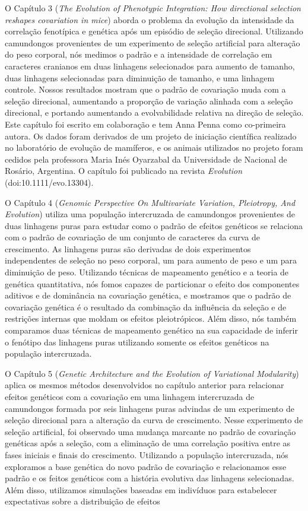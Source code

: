 \begin{refsection}
O Capítulo 3 (\textit{The Evolution of Phenotypic Integration: How directional
selection reshapes covariation in mice}) aborda o problema da evolução da
intensidade da correlação fenotípica e genética após um episódio de seleção
direcional. Utilizando camundongos provenientes de um experimento de seleção
artificial para alteração do peso corporal, nós medimos o padrão e a
intensidade de correlação em caracteres cranianos em duas linhagens
selecionados para aumento de tamanho, duas linhagens selecionadas para
diminuição de tamanho, e uma linhagem controle. Nossos resultados mostram que
o padrão de covariação muda com a seleção direcional, aumentando a proporção
de variação alinhada com a seleção direcional, e portando aumentando a
evolvabilidade relativa na direção de seleção. Este capítulo foi escrito em
colaboração e tem Anna Penna como co-primeira autora. Os dados foram derivados
de um projeto de iniciação científica realizado no laboratório de evolução de
mamíferos, e os animais utilizados no projeto foram cedidos pela professora
Maria Inés Oyarzabal da Universidade de Nacional de Rosário, Argentina. O
capítulo foi publicado na revista \textit{Evolution} (doi:10.1111/evo.13304).

O Capítulo 4 (\textit{Genomic Perspective On Multivariate Variation,
Pleiotropy, And Evolution}) utiliza uma população intercruzada de camundongos
provenientes de duas linhagens puras para estudar como o padrão de efeitos
genéticos se relaciona com o padrão de covariação de um conjunto de caracteres
da curva de crescimento. As linhagens puras são derivadas de dois experimentos
independentes de seleção no peso corporal, um para aumento de peso e um para
diminuição de peso. Utilizando técnicas de mapeamento genético e a teoria de
genética quantitativa, nós fomos capazes de particionar o efeito dos
componentes aditivos e de dominância na covariação genética, e mostramos que o
padrão de covariação genética é o resultado da combinação da influência da
seleção e de restrições internas que moldam os efeitos pleiotrópicos. Além
disso, nós também comparamos duas técnicas de mapeamento genético na sua
capacidade de inferir o fenótipo das linhagens puras utilizando somente os
efeitos genéticos na população intercruzada. 

O Capítulo 5 (\textit{Genetic Architecture and the Evolution of Variational
Modularity}) aplica os mesmos métodos desenvolvidos no capítulo anterior para
relacionar efeitos genéticos com a covariação em uma linhagem intercruzada de
camundongos formada por seis linhagens puras advindas de um experimento de
seleção direcional para a alteração da curva de crescimento. Nesse experimento
de seleção artificial, foi observado uma mudança marcante no padrão de
covariação genéticas após a seleção, com a eliminação de uma correlação
positiva entre as fases iniciais e finais do crescimento. Utilizando a
população intercruzada, nós exploramos a base genética do novo padrão de
covariação e relacionamos esse padrão e os feitos genéticos com a história
evolutiva das linhagens selecionadas. Além disso, utilizamos simulações baseadas
em indivíduos para estabelecer expectativas sobre a distribuição de efeitos


\end{refsection}
